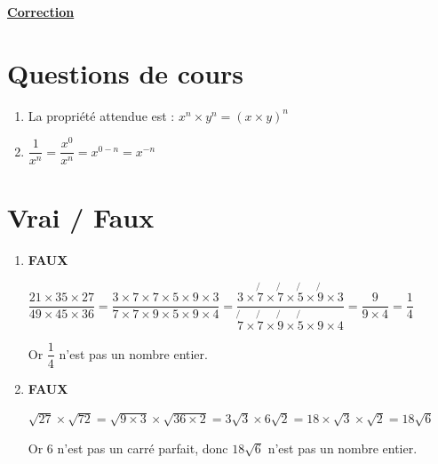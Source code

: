 \documentclass[oneside,12pt]{exam}          %
\begin{document}
\begin{center}
	\Large \textbf{\underline{Correction}}
\end{center}




\section{Questions de cours}
\begin{enumerate}
	\item La propriété attendue est : $x^n \times y^n = (x \times y)^n$
	\item $\dfrac{1}{x^n} = \dfrac{x^0}{x^n} = x^{0-n} = x^{-n}$
\end{enumerate}



\section{Vrai / Faux}
\begin{enumerate}[label=\underline{Affirmation \no \arabic*} : ,leftmargin=* , itemsep=1mm]
	\item \textbf{FAUX}
	
	$\dfrac{21 \times 35 \times 27}{49 \times 45 \times 36}
	= \dfrac{3 \times 7 \times 7 \times 5 \times 9 \times 3}{7 \times 7 \times 9 \times 5 \times 9 \times 4}
	= \dfrac{3 \times \not{7} \times \not{7} \times \not{5} \times \not{9} \times 3}{\not{7} \times \not{7} \times \not{9} \times \not{5} \times 9 \times 4} = \dfrac{9}{9 \times 4} = \dfrac{1}{4}$
	
	Or $\dfrac{1}{4}$ n'est pas un nombre entier.
	
	\item \textbf{FAUX} 
	
	$\sqrt{27} \times \sqrt{72} = \sqrt{9 \times 3} \times \sqrt{36 \times 2} = 3 \sqrt{3} \times 6 \sqrt{2} = 18 \times \sqrt{3} \times \sqrt{2} = 18 \sqrt{6}$
	
	Or $6$ n'est pas un carré parfait, donc $18\sqrt{6}$ n'est pas un nombre entier.
\end{enumerate}
\end{document}

